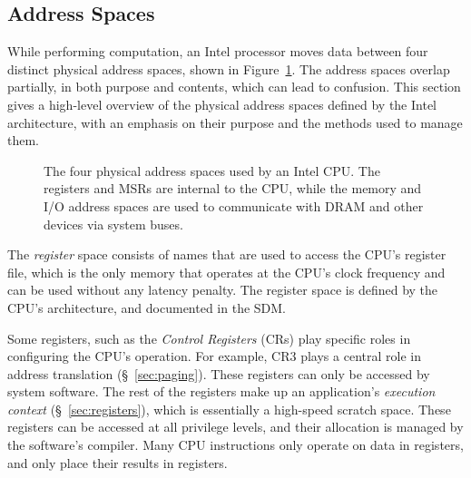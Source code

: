 \subsection{Address Spaces}
\label{sec:address_spaces}

While performing computation, an Intel processor moves data between four
distinct physical address spaces, shown in Figure~\ref{fig:address_spaces}. The
address spaces overlap partially, in both purpose and contents, which can lead
to confusion. This section gives a high-level overview of the physical address
spaces defined by the Intel architecture, with an emphasis on their purpose and
the methods used to manage them.

\begin{figure}[hbtp]
  \caption{
    The four physical address spaces used by an Intel CPU. The registers and
    MSRs are internal to the CPU, while the memory and I/O address spaces are
    used to communicate with DRAM and other devices via system buses.
  }
  \label{fig:address_spaces}
\end{figure}

The \textit{register} space consists of names that are used to access the CPU's
register file, which is the only memory that operates at the CPU's clock
frequency and can be used without any latency penalty. The register space is
defined by the CPU's architecture, and documented in the SDM.

Some registers, such as the \textit{Control Registers} (CRs) play specific
roles in configuring the CPU's operation. For example, CR3 plays a central role
in address translation (\S~\ref{sec:paging}). These registers can only be
accessed by system software. The rest of the registers make up an application's
\textit{execution context} (\S~\ref{sec:registers}), which is essentially a
high-speed scratch space. These registers can be accessed at all privilege
levels, and their allocation is managed by the software's compiler. Many CPU
instructions only operate on data in registers, and only place their results in
registers.

